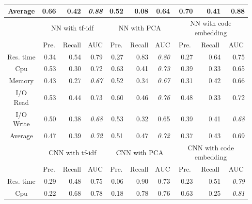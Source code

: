 \documentclass[10pt,journal,compsoc]{IEEEtran}
\begin{document}
\begin{table}
\begin{tabular}{|c|r|r|r|r|r|r|r|r|r|}
Average           & 0.66  & 0.42    & \textit{0.88}            & 0.52  & 0.08    & 0.64 & 0.70  & 0.41    & 0.88 \\ \hline
\multirow{2}{*}{} & \multicolumn{3}{c|}{NN with tf-idf}        & \multicolumn{3}{c|}{NN with PCA}           & \multicolumn{3}{c|}{NN with code embedding}\\ \cline{2-10} 
                  & \multicolumn{1}{c|}{Pre.} & \multicolumn{1}{c|}{Recall} & \multicolumn{1}{c|}{AUC} & \multicolumn{1}{c|}{Pre.} & \multicolumn{1}{c|}{Recall} & \multicolumn{1}{c|}{AUC} & \multicolumn{1}{c|}{Pre.} & \multicolumn{1}{c|}{Recall} & \multicolumn{1}{c|}{AUC} \\ \hline
Res. time         & 0.34  & 0.54    & 0.79 & 0.27  & 0.83    & \textit{0.80}            & 0.27  & 0.64    & 0.75 \\ \hline
Cpu               & 0.53  & 0.30    & 0.72 & 0.63  & 0.41    & \textit{0.73}            & 0.39  & 0.33    & 0.65 \\ \hline
Memory            & 0.43  & 0.27    & \textit{0.67}            & 0.52  & 0.34    & \textit{0.67}            & 0.31  & 0.42    & 0.66 \\ \hline
I/O Read          & 0.53  & 0.44    & 0.73 & 0.60  & 0.46    & \textit{0.76}            & 0.48  & 0.33    & 0.72 \\ \hline
I/O Write         & 0.50  & 0.38    & \textit{0.68}            & 0.53  & 0.32    & 0.65 & 0.39  & 0.41    & \textit{0.68}            \\ \hline
Average           & 0.47  & 0.39    & \textit{0.72}            & 0.51  & 0.47    & \textit{0.72}            & 0.37  & 0.43    & 0.69 \\ \hline
\multirow{2}{*}{} & \multicolumn{3}{c|}{CNN with tf-idf}       & \multicolumn{3}{c|}{CNN with PCA}          & \multicolumn{3}{c|}{CNN with code embedding}                   \\ \cline{2-10} 
                  & \multicolumn{1}{c|}{Pre.} & \multicolumn{1}{c|}{Recall} & \multicolumn{1}{c|}{AUC} & \multicolumn{1}{c|}{Pre.} & \multicolumn{1}{c|}{Recall} & \multicolumn{1}{c|}{AUC} & \multicolumn{1}{c|}{Pre.} & \multicolumn{1}{c|}{Recall} & \multicolumn{1}{c|}{AUC} \\ \hline
Res. time         & 0.29  & 0.48    & 0.75 & 0.06  & 0.90    & 0.73 & 0.23  & 0.51    & \textit{0.79}            \\ \hline
Cpu               & 0.22  & 0.68    & 0.78 & 0.18  & 0.78    & 0.76 & 0.63  & 0.25    & \textit{0.81}            \\ \hline

\end{tabular}
\end{table}
\end{document}
